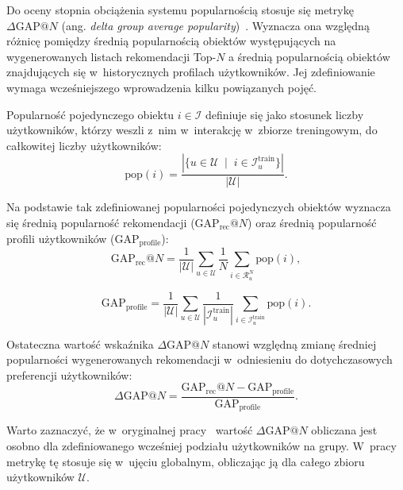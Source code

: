 Do oceny stopnia obciążenia systemu popularnością stosuje się metrykę $\Delta\text{GAP}@N$ (ang. \textit{delta group average popularity})~\cite{abdollahpouri2019unfairness}. Wyznacza ona względną różnicę pomiędzy średnią popularnością obiektów występujących na wygenerowanych listach rekomendacji Top-$N$ a średnią popularnością obiektów znajdujących się w~historycznych profilach użytkowników. Jej zdefiniowanie wymaga wcześniejszego wprowadzenia kilku powiązanych pojęć.

Popularność pojedynczego obiektu $i \in \mathcal{I}$ definiuje się jako stosunek liczby użytkowników, którzy weszli z~nim w~interakcję w~zbiorze treningowym, do całkowitej liczby użytkowników:
\begin{equation}
    \text{pop}(i) = \frac{\left| \{ u \in \mathcal{U} \;\mid\; i \in \mathcal{I}_u^{\text{train}} \} \right|}{|\mathcal{U}|}.
\end{equation}

Na podstawie tak zdefiniowanej popularności pojedynczych obiektów wyznacza się średnią popularność rekomendacji ($\text{GAP}_{\text{rec}}@N$) oraz średnią popularność profili użytkowników ($\text{GAP}_{\text{profile}}$):
\begin{equation}
    \text{GAP}_{\text{rec}}@N = \frac{1}{|\mathcal{U}|} \sum_{u \in \mathcal{U}} \frac{1}{N} \sum_{i \in \mathcal{R}_u^N} \text{pop}(i),
\end{equation}

\begin{equation}
    \text{GAP}_{\text{profile}} = \frac{1}{|\mathcal{U}|} \sum_{u \in \mathcal{U}} \frac{1}{\left| \mathcal{I}_u^{\text{train}} \right|} \sum_{i \in \mathcal{I}_u^{\text{train}}} \text{pop}(i).
\end{equation}

Ostateczna wartość wskaźnika $\Delta\text{GAP}@N$ stanowi względną zmianę średniej popularności wygenerowanych rekomendacji w~odniesieniu do dotychczasowych preferencji użytkowników:
\begin{equation}
    \Delta\text{GAP}@N = \frac{\text{GAP}_{\text{rec}}@N - \text{GAP}_{\text{profile}}}{\text{GAP}_{\text{profile}}}.
\end{equation}

Warto zaznaczyć, że w~oryginalnej pracy~\cite{abdollahpouri2019unfairness} wartość $\Delta\text{GAP}@N$ obliczana jest osobno dla zdefiniowanego wcześniej podziału użytkowników na grupy. W~pracy metrykę tę stosuje się w~ujęciu globalnym, obliczając ją dla całego zbioru użytkowników $\mathcal{U}$.

